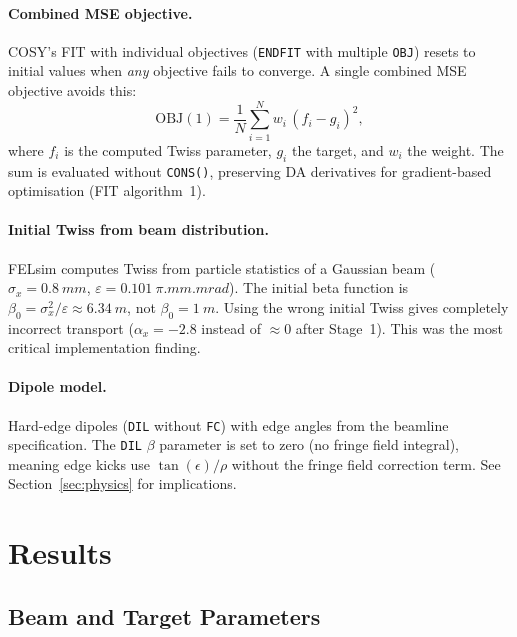 \documentclass[11pt]{article}
\begin{document}
\paragraph{Combined MSE objective.}
COSY's FIT with individual objectives (\texttt{ENDFIT} with multiple
\texttt{OBJ}) resets to initial values when \emph{any} objective fails to
converge. A single combined MSE objective avoids this:
\begin{equation}
  \mathrm{OBJ}(1) = \frac{1}{N}\sum_{i=1}^{N} w_i\,(f_i - g_i)^2,
\end{equation}
where $f_i$ is the computed Twiss parameter, $g_i$ the target, and $w_i$ the
weight. The sum is evaluated without \texttt{CONS()}, preserving DA derivatives
for gradient-based optimisation (FIT algorithm~1).

\paragraph{Initial Twiss from beam distribution.}
FELsim computes Twiss from particle statistics of a Gaussian beam
($\sigma_x = \SI{0.8}{mm}$, $\varepsilon = \SI{0.101}{\pi.mm.mrad}$).
The initial beta function is $\beta_0 = \sigma_x^2/\varepsilon \approx
\SI{6.34}{m}$, not $\beta_0 = \SI{1}{m}$. Using the wrong initial Twiss
gives completely incorrect transport ($\alpha_x = -2.8$ instead of $\approx 0$
after Stage~1). This was the most critical implementation finding.

\paragraph{Dipole model.}
Hard-edge dipoles (\texttt{DIL} without \texttt{FC}) with edge angles from
the beamline specification. The \texttt{DIL} $\beta$ parameter is set to zero
(no fringe field integral), meaning edge kicks use $\tan(\epsilon)/\rho$
without the fringe field correction term. See Section~\ref{sec:physics} for
implications.


\section{Results}

\subsection{Beam and Target Parameters}
\end{document}

